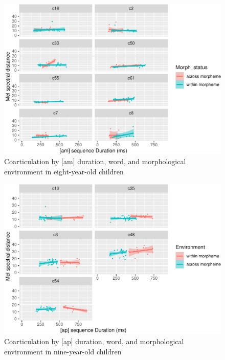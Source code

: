 \documentclass[
]{article}
\begin{document}
\begin{figure}
\centering
\includegraphics{3_ch3_results_files/figure-latex/eight-facet-am-1.pdf}
\caption{\label{fig:eight-facet-am}Coarticulation by {[}am{]} duration, word, and morphological environment in eight-year-old children}
\end{figure}

\begin{figure}
\centering
\includegraphics{3_ch3_results_files/figure-latex/nine-facet-ap-1.pdf}
\caption{\label{fig:nine-facet-ap}Coarticulation by {[}ap{]} duration, word, and morphological environment in nine-year-old children}
\end{figure}
\end{document}
